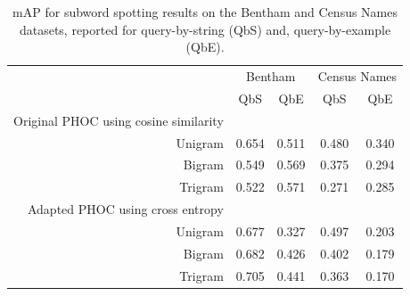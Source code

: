 \documentclass[ms,electronic,twosidetoc,letterpaper,chaptercenter,parttop,lof,lot]{byumsphd}
\begin{document}

\begin{table}
\centering
\begin{tabular}{| r | c c | c c |}
  \hline
   & \multicolumn{2}{c|}{Bentham} & \multicolumn{2}{c|}{Census Names}\\
   & QbS  & QbE    &  QbS &  QbE    \\
  \hline 
  Original PHOC using cosine similarity & & & & \\
  Unigram &  0.654 &  0.511  & 0.480 &  0.340 \\
  Bigram  &  0.549 &  0.569  & 0.375 &  0.294 \\
  Trigram &  0.522 &  0.571  & 0.271 &  0.285 \\
  \hline
  
  Adapted PHOC using cross entropy & & & & \\
  Unigram &  0.677 &  0.327  & 0.497 &  0.203 \\ 
  Bigram  &  0.682 &  0.426  & 0.402 &  0.179 \\
  Trigram &  0.705 &  0.441  & 0.363 &  0.170 \\
  \hline 
\end{tabular}
\caption{mAP for subword spotting results on the Bentham and Census Names datasets, reported for query-by-string (QbS) and, query-by-example (QbE).}
\label{tab:subwordspotting}
\end{table}
\end{document}
